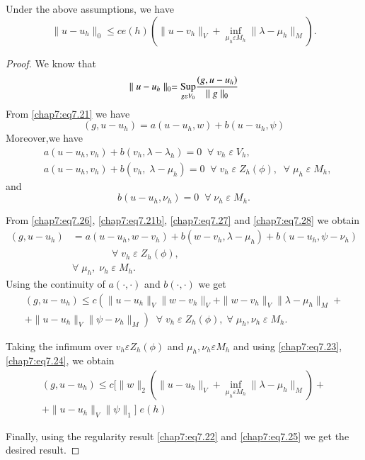 \setcounter{THM}{3}
\begin{THM}\label{chap7:THM4}
Under the above assumptions, we have 
$$
\parallel u-u_h\parallel_0\leq ce(h)\left(\parallel u-v_h \parallel_V
+\inf\limits_{\mu_h\varepsilon M_h}\parallel\lambda-\mu_h\parallel_M
\right).
$$
\end{THM}

\begin{proof}
We know that 
\begin{equation}\label{chap7:eq7.25}
\parallel u-u_h\parallel_0=\underset{g\varepsilon V_0}{\operatorname{Sup}}
\frac{(g,u-u_h)}{\parallel g\parallel_0}
\end{equation}
From \eqref{chap7:eq7.21} we have 
\begin{equation}\label{chap7:eq7.26}
(g,u-u_h)=a(u-u_h,w)+b(u-u_h,\psi)
\end{equation}
Moreover,\pageoriginale we have
\begin{align*}
&a(u-u_h,v_h)+b(v_h,\lambda-\lambda_h)=0 \;\; \forall \;v_h \;\varepsilon
\;V_h,\\
&a(u-u_h,v_h)+b(v_h,\;\lambda-\mu_h)=0\; \;\forall \;v_h\;\varepsilon
\;Z_h(\phi),\; \; \forall \;\mu_h\;\varepsilon \;M_h,\tag{7.27} \label{chap7:eq7.27}
\end{align*}
and 
\setcounter{equation}{27}
\begin{equation}\label{chap7:eq7.28}
b(u-u_h,\nu_h)=0\; \; \forall\;\nu_h \;\varepsilon \; M_h.
\end{equation}

From \eqref{chap7:eq7.26}, \eqref{chap7:eq7.21b}, \eqref{chap7:eq7.27}
and \eqref{chap7:eq7.28} we obtain 
\begin{align*}
(g,u-u_h)&=a(u-u_h,w-v_h)+b(w-v_h,\lambda-\mu_h)+b(u-u_h,\psi-\nu_h)\\
&\qquad\qquad\forall\;v_h \;\varepsilon \;Z_h(\phi),\\
&\forall\;\mu_h,\;\nu_h\;\varepsilon \;M_h.
\end{align*}
Using the continuity of $a(\cdotp,\cdotp)$ and $b(\cdotp,\cdotp)$ we
get
\begin{multline*}
(g,u-u_h)\leq c\left(\parallel u-u_h\parallel_V\parallel w-v_h
\parallel_V +\parallel w-v_h\parallel_V\parallel\lambda-\mu_h
\parallel_M +\right.\\
\left.+\parallel u-u_h\parallel_V\parallel \psi-\nu_h\parallel_M \right) 
\; \; \forall \;v_h\;\varepsilon \;Z_h(\phi),\;\forall \; \mu_h ,\nu_h
\;\varepsilon \; M_h.
\end{multline*}

Taking the infimum over $v_h\varepsilon Z_h(\phi)$ and $\mu_h,\nu_h
\varepsilon M_h$ and using \eqref{chap7:eq7.23}, \eqref{chap7:eq7.24},
we obtain
\begin{align*}
(g,u-u_h)\leq c[\parallel w\parallel_2\left(\parallel u-u_h
\parallel_V+\inf\limits_{\mu_h\varepsilon M_h}\parallel \lambda-\mu_h
\parallel_M\right)+ \\
+\parallel u-u_h\parallel_V\parallel\psi\parallel_1]\;e(h)
\end{align*}

Finally, using the regularity result \eqref{chap7:eq7.22} and
\eqref{chap7:eq7.25} we get the desired result.
\end{proof}

